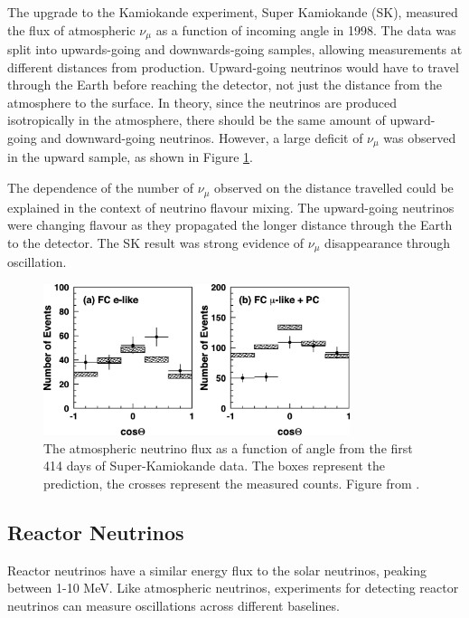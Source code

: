 The upgrade to the Kamiokande experiment, Super Kamiokande (SK), measured the flux of atmospheric $\nu_{\mu}$ as a function of incoming angle in 1998. The data was split into upwards-going and downwards-going samples, allowing measurements at different distances from production. Upward-going neutrinos would have to travel through the Earth before reaching the detector, not just the distance from the atmosphere to the surface. In theory, since the neutrinos are produced isotropically in the atmosphere, there should be the same amount of upward-going and downward-going neutrinos. However, a large deficit of $\nu_{\mu}$ was observed in the upward sample, as shown in Figure \ref{atmosflux}.

The dependence of the number of $\nu_{\mu}$ observed on the distance travelled could be explained in the context of neutrino flavour mixing. The upward-going neutrinos were changing flavour as they propagated the longer distance through the Earth to the detector. The SK result was strong evidence of $\nu_{\mu}$ disappearance through oscillation.

\begin{figure}[!htbp]
\vspace{20pt}
\centering
\includegraphics*[width=0.8\textwidth,clip]{figs/atmosfluxsk.png}
\caption{The atmospheric neutrino flux as a function of angle from the first 414 days of Super-Kamiokande data. The boxes represent the prediction, the crosses represent the measured counts. Figure from \cite{skfluxatmos}.} \label{atmosflux}
\end{figure}

\subsection{Reactor Neutrinos}\label{sec:reactorneutrinos}

Reactor neutrinos have a similar energy flux to the solar neutrinos, peaking between 1-10 MeV. Like atmospheric neutrinos, experiments for detecting reactor neutrinos can measure oscillations across different baselines.


